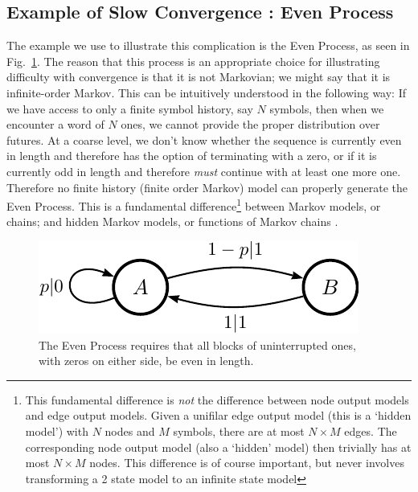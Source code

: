 \subsection{Example of Slow Convergence : Even Process}
The example we use to illustrate this complication is the Even Process, as seen in Fig.~\ref{fig:even_feM_gr}. The reason that this process is an appropriate choice for illustrating difficulty with convergence is that it is not Markovian; we might say that it is infinite-order Markov. This can be intuitively understood in the following way: If we have access to only a finite symbol history, say $N$ symbols, then when we encounter a word of $N$ ones, we cannot provide the proper distribution over futures. At a coarse level, we don't know whether the sequence is currently even in length and therefore has the option of terminating with a zero, or if it is currently odd in length and therefore \emph{must} continue with at least one more one. Therefore no finite history (finite order Markov) model can properly generate the Even Process. This is a fundamental difference\footnote{This fundamental difference is \emph{not} the difference between node output models and edge output models. Given a unifilar edge output model (this is a `hidden model') with $N$ nodes and $M$ symbols, there are at most $N \times M$ edges. The corresponding node output model (also a `hidden' model) then trivially has at most $N \times M$ nodes. This difference is of course important, but never involves transforming a 2 state model to an infinite state model} between Markov models, or chains; and hidden Markov models, or functions of Markov chains .
\begin{figure}[h!]
\centering
\includegraphics[scale = 1.0]{../chapter1/figures/even_feM_gr}
\caption{The Even Process requires that all blocks of uninterrupted ones, with zeros on either side, be even in length.}
\label{fig:even_feM_gr}
\end{figure}

